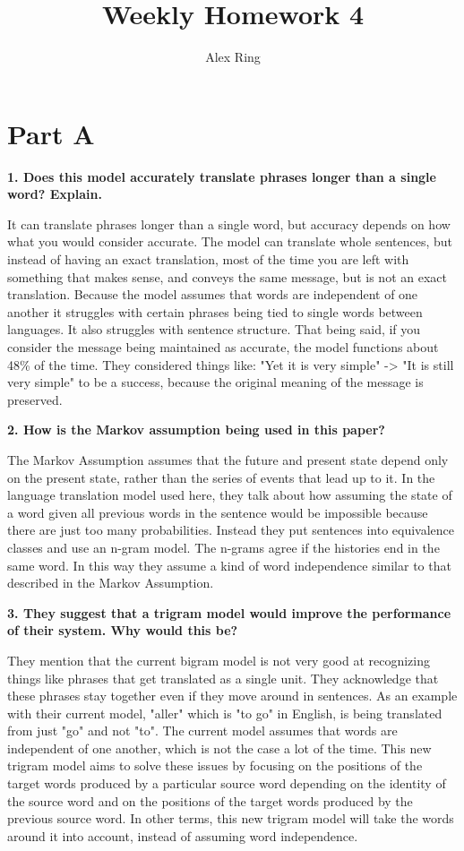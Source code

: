 \documentclass[11pt, oneside]{article}   	%
\title{Weekly Homework 4}
\author{Alex Ring}
\date{}							%
\begin{document}
\maketitle
\section{Part A}
\textbf{1. Does this model accurately translate phrases longer than a single word? Explain.}

It can translate phrases longer than a single word, but accuracy depends on how what you would consider accurate. The model can translate whole sentences, but instead of having an exact translation, most of the time you are left with something that makes sense, and conveys the same message, but is not an exact translation. Because the model assumes that words are independent of one another it struggles with certain phrases being tied to single words between languages. It also struggles with sentence structure. That being said, if you consider the message being maintained as accurate, the model functions about 48\% of the time. They considered things like: "Yet it is very simple" -> "It is still very simple" to be a success, because the original meaning of the message is preserved. 

\textbf{2. How is the Markov assumption being used in this paper?}

The Markov Assumption assumes that the future and present state depend only on the present state, rather than the series of events that lead up to it. In the language translation model used here, they talk about how assuming the state of a word given all previous words in the sentence would be impossible because there are just too many probabilities. Instead they put sentences into  equivalence classes and use an n-gram model. The n-grams agree if the histories end in the same word. In this way they assume a kind of word independence similar to that described in the Markov Assumption. 

\textbf{3. They suggest that a trigram model would improve the performance of their system. Why would this be?}

They mention that the current bigram model is not very good at recognizing things like phrases that get translated as a single unit. They acknowledge that these phrases stay together even if they move around in sentences. As an example with their current model, "aller" which is "to go" in English, is being translated from just "go" and not "to". The current model assumes that words are independent of one another, which is not the case a lot of the time. This new trigram model aims to solve these issues by focusing on the positions of the target words produced by a particular source word depending on the identity of the source word and on the positions of the target words produced by the previous source word. In other terms, this new trigram model will take the words around it into account, instead of assuming word independence. 
\end{document}
